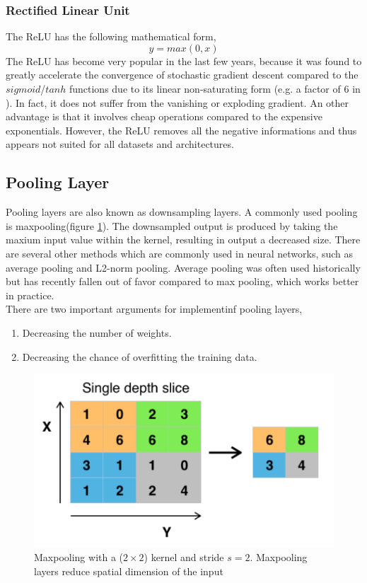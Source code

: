     \subsubsection{Rectified Linear Unit}
    The ReLU has the following mathematical form,
    \begin{equation}
        y = max(0, x)
    \end{equation}
    The ReLU has become very popular in the last few years, because it was found to greatly accelerate the convergence of stochastic gradient descent compared to the $sigmoid$/$tanh$ functions due to its linear non-saturating form (e.g. a factor of 6 in \cite{krizhevsky2012imagenet}). In fact, it does not suffer from the vanishing or exploding gradient. An other advantage is that it involves cheap operations compared to the expensive exponentials. However, the ReLU removes all the negative informations and thus appears not suited for all datasets and architectures.

    \subsection{Pooling Layer}
    Pooling layers are also known as downsampling layers. A commonly used pooling is maxpooling(figure \ref{maxpooling}). The downsampled output is produced by taking the maxium input value within the kernel, resulting in output a decreased size. There are several other methods which are commonly used in neural networks, such as average pooling and L2-norm pooling. Average pooling was often used historically but has recently fallen out of favor compared to max pooling, which works better in practice\cite{scherer2010evaluation}.\\

    There are two important arguments for implementinf pooling layers,
    \begin{enumerate}
        \item Decreasing the number of weights.
        \item Decreasing the chance of overfitting the training data.
    \end{enumerate}
    \begin{figure}[!h]
        \centering
        \includegraphics[scale=0.5]{Figures/Max_pooling.pdf}
        \caption{Maxpooling with a ($2\times 2$) kernel and stride $s=2$. Maxpooling layers reduce spatial dimension of the input \cite{li2015convolutional}}
        \label{maxpooling}
    \end{figure}

